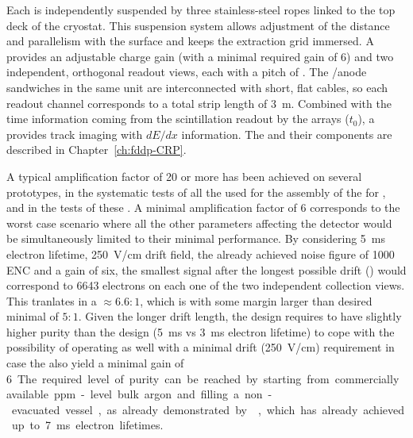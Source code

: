 Each  is independently suspended by three stainless-steel ropes linked to the top deck of the cryostat. This suspension system allows adjustment of the  distance and parallelism with the  surface and keeps the extraction grid immersed. A  provides an adjustable charge gain (with a minimal required gain of \num{6}) and two independent, orthogonal readout views, each with a pitch of \dpstrippitch.  The /anode sandwiches  in the same  unit are interconnected with short, flat cables, so each readout channel corresponds to a total strip length of \SI{3}{m}. Combined with the time information coming from the  scintillation readout by the  arrays ($t_0$), a  provides \threed track imaging with $dE/dx$ information.  The  and their components are described in Chapter~\ref{ch:fddp-CRP}.

A typical amplification factor of 20 or more has been achieved on several prototypes, in the systematic tests of all the  used for the assembly of the  for , and in the \coldbox tests of these . A minimal   amplification factor of 6 corresponds to the worst case scenario where all the other parameters affecting the detector  would be simultaneously limited to their minimal performance. By considering   \SI{5}{ms} electron lifetime,  \SI{250}{V/cm} drift field, the already achieved noise figure of 1000 ENC and a   gain of six,  the smallest  signal after the longest possible drift (\dpmaxdrift{})  would correspond to \num{6643} electrons on each one of the two independent collection views. This tranlates in a  $\approx  \num{6.6}:\num{1}$, which is with some margin larger than desired minimal  of $\num{5}:\num{1}$.
Given the longer drift length, the  design requires  to have slightly higher purity than the  design (\SI{5}{ms} vs \SI{3}{ms}  electron lifetime) to cope with the possibility of operating as well with a minimal drift \efield (\SI{250}{V/cm}) requirement in case the  also yield a minimal gain of \SI{6}. The required level of purity can be reached by starting from  commercially available ppm-level bulk argon and filling a non-evacuated vessel, as already demonstrated by , which has already achieved up to \SI{7}{ms} electron lifetimes.

